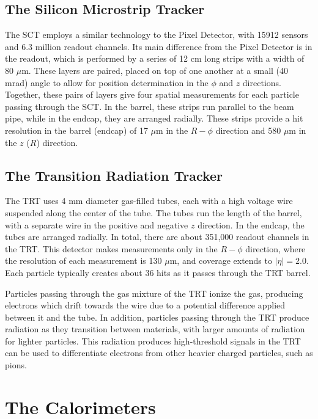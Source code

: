 \subsection{The Silicon Microstrip Tracker}

The \ac{SCT} employs a similar technology to the Pixel Detector, with 15912 sensors and 6.3 million readout channels. Its main difference from the Pixel Detector is in the readout, which is performed by a series of 12 cm long strips with a width of 80 $\mu$m. These layers are paired, placed on top of one another at a small (40 mrad) angle to allow for position determination in the $\phi$ and $z$ directions. Together, these pairs of layers give four spatial measurements for each particle passing through the \ac{SCT}. In the barrel, these strips run parallel to the beam pipe, while in the endcap, they are arranged radially. These strips provide a hit resolution in the barrel (endcap) of 17 $\mu$m in the $R-\phi$ direction and 580 $\mu$m in the $z$ ($R$) direction. 

\subsection{The Transition Radiation Tracker}

The \ac{TRT} uses 4 mm diameter gas-filled tubes, each with a high voltage wire suspended along the center of the tube. The tubes run the length of the barrel, with a separate wire in the positive and negative $z$ direction. In the endcap, the tubes are arranged radially. In total, there are about 351,000 readout channels in the \ac{TRT}. This detector makes measurements only in the $R-\phi$ direction, where the resolution of each measurement is 130 $\mu$m, and coverage extends to $|\eta|=2.0$. Each particle typically creates about 36 hits as it passes through the \ac{TRT} barrel. 

Particles passing through the gas mixture of the \ac{TRT} ionize the gas, producing electrons which drift towards the wire due to a potential difference applied between it and the tube. In addition, particles passing through the \ac{TRT} produce radiation as they transition between materials, with larger amounts of radiation for lighter particles. This radiation produces high-threshold signals in the \ac{TRT} can be used to differentiate electrons from other heavier charged particles, such as pions. 


\section{The Calorimeters}
\label{sec:Calo}

